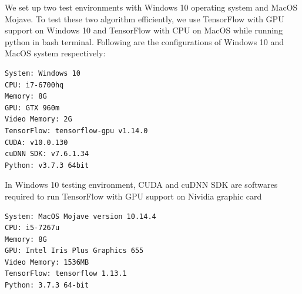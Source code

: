 \documentclass[letterpaper]{article} %
\begin{document}
We set up two test environments with Windows 10 operating system and MacOS Mojave. To test these two algorithm efficiently, we use TensorFlow with GPU support on Windows 10 and TensorFlow with CPU on MacOS while running python in bash terminal. Following are the configurations of Windows 10 and MacOS system respectively:
\begin{lstlisting}[columns=fullflexible, keepspaces=true, stepnumber=1]
System: Windows 10
CPU: i7-6700hq
Memory: 8G
GPU: GTX 960m
Video Memory: 2G
TensorFlow: tensorflow-gpu v1.14.0
CUDA: v10.0.130
cuDNN SDK: v7.6.1.34
Python: v3.7.3 64bit
\end{lstlisting}
In Windows 10 testing environment, CUDA and cuDNN SDK are softwares required to run TensorFlow with GPU support on Nividia graphic card
\begin{lstlisting}[columns=fullflexible, keepspaces=true, stepnumber=1]
System: MacOS Mojave version 10.14.4
CPU: i5-7267u
Memory: 8G
GPU: Intel Iris Plus Graphics 655
Video Memory: 1536MB
TensorFlow: tensorflow 1.13.1
Python: 3.7.3 64-bit
\end{lstlisting}



\newpage


\end{document}

